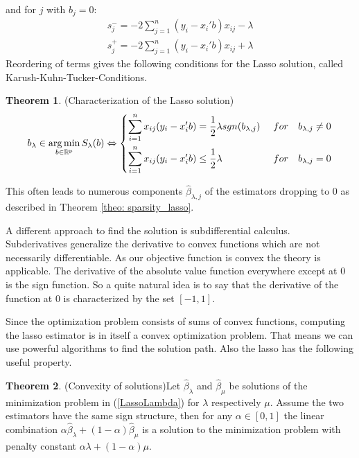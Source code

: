 \documentclass{article}
\theoremstyle{definition}
\newtheorem{theorem}{Theorem}
\DeclareMathOperator*{\argmin}{arg\,min}
\begin{document}
\noindent and for $j$ with $b_j = 0$:
\begin{align}
	s_j^{-} = -2 \sum_{j=1}^{n} (y_i -x_i'b) x_{ij} - \lambda \\
	s_j^{+} = -2 \sum_{j=1}^{n} (y_i -x_i'b) x_{ij} + \lambda
\end{align} 
Reordering of terms gives the following conditions for the Lasso solution, called Karush-Kuhn-Tucker-Conditions.

\begin{theorem}(Characterization of the Lasso solution)
	\begin{align*}
	b_\lambda \in \argmin_{b \in\rm \mathbb{R}^p} S_\lambda(b) \Leftrightarrow \begin{dcases} 
	\sum_{i=1}^n x_{ij}(y_i-x_i'b)= \frac{1}{2}\lambda sgn(b_{\lambda,j}) &\ for \quad b_{\lambda,j} \neq0 \\   
	\sum_{i=1}^n x_{ij}(y_i-x_i'b) \leq  \frac{1}{2}\lambda \ &\ for \quad b_{\lambda,j}=0
	\end{dcases} 
	\end{align*}
\end{theorem}

This often leads to numerous components $\hat\beta_{\lambda,j}$ of the estimators dropping to 0 as described in Theorem \eqref{theo: sparsity_lasso}. \newline

A different approach to find the solution is subdifferential calculus. 
Subderivatives generalize the derivative to convex functions which are not necessarily differentiable.
As our objective function is convex the theory is applicable.
The derivative of the absolute value function everywhere except at 0 is the sign function. So a quite natural idea is to say that the derivative of the function at 0 is characterized by the set $[-1,1]$.


Since the optimization problem consists of sums of convex functions, computing the lasso estimator is in itself a convex optimization problem. That means we can use powerful algorithms to find the solution path. Also the lasso has the following useful property.
\bigskip

\begin{theorem}(Convexity of solutions)\label{th: convexitylassosolution}
	Let $\hat{\beta}_{\lambda}$ and $\hat{\beta}_\mu$ be solutions of the minimization problem in (\ref{LassoLambda}) for $\lambda$ respectively $\mu$. Assume the two estimators have the same sign structure, then for any
	$\alpha\in[0,1]$ the linear combination $\alpha\hat{\beta}_{\lambda}+ (1-\alpha)\hat{\beta}_\mu$ is a solution to the minimization problem with penalty constant $\alpha \lambda + (1-\alpha) \mu$.
\end{theorem}
\end{document}
